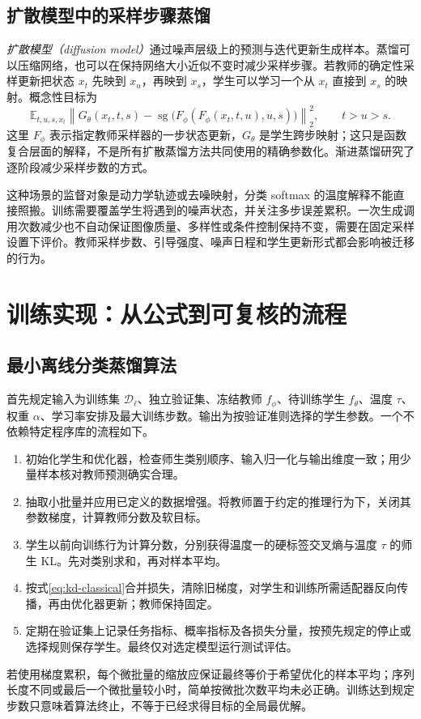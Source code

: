 \documentclass[UTF8,12pt,a4paper,fontset=fandol]{ctexart}
\begin{document}
\subsection{扩散模型中的采样步骤蒸馏}
\emph{扩散模型（diffusion model）}通过噪声层级上的预测与迭代更新生成样本。蒸馏可以压缩网络，也可以在保持网络大小近似不变时减少采样步骤。若教师的确定性采样更新把状态 $x_t$ 先映到 $x_u$，再映到 $x_s$，学生可以学习一个从 $x_t$ 直接到 $x_s$ 的映射。概念性目标为
\[
 \mathbb E_{t,u,s,x_t}\left\|
 G_\theta(x_t,t,s)-\operatorname{sg}
 \bigl(F_\phi(F_\phi(x_t,t,u),u,s)\bigr)\right\|_2^2,
 \qquad t>u>s.
\]
这里 $F_\phi$ 表示指定教师采样器的一步状态更新，$G_\theta$ 是学生跨步映射；这只是函数复合层面的解释，不是所有扩散蒸馏方法共同使用的精确参数化。渐进蒸馏研究了逐阶段减少采样步数的方式\cite{salimans2022}。

这种场景的监督对象是动力学轨迹或去噪映射，分类 softmax 的温度解释不能直接照搬。训练需要覆盖学生将遇到的噪声状态，并关注多步误差累积。一次生成调用次数减少也不自动保证图像质量、多样性或条件控制保持不变，需要在固定采样设置下评价。教师采样步数、引导强度、噪声日程和学生更新形式都会影响被迁移的行为。

\section{训练实现：从公式到可复核的流程}
\label{sec:kd-implementation}

\subsection{最小离线分类蒸馏算法}
首先规定输入为训练集 $\mathcal D_\ell$、独立验证集、冻结教师 $f_\phi$、待训练学生 $f_\theta$、温度 $\tau$、权重 $\alpha$、学习率安排及最大训练步数。输出为按验证准则选择的学生参数。一个不依赖特定程序库的流程如下。
\begin{enumerate}
 \item 初始化学生和优化器，检查师生类别顺序、输入归一化与输出维度一致；用少量样本核对教师预测确实合理。
 \item 抽取小批量并应用已定义的数据增强。将教师置于约定的推理行为下，关闭其参数梯度，计算教师分数及软目标。
 \item 学生以前向训练行为计算分数，分别获得温度一的硬标签交叉熵与温度 $\tau$ 的师生 KL。先对类别求和，再对样本平均。
 \item 按式\eqref{eq:kd-classical}合并损失，清除旧梯度，对学生和训练所需适配器反向传播，再由优化器更新；教师保持固定。
 \item 定期在验证集上记录任务指标、概率指标及各损失分量，按预先规定的停止或选择规则保存学生。最终仅对选定模型运行测试评估。
\end{enumerate}
若使用梯度累积，每个微批量的缩放应保证最终等价于希望优化的样本平均；序列长度不同或最后一个微批量较小时，简单按微批次数平均未必正确。训练达到规定步数只意味着算法终止，不等于已经求得目标的全局最优解。
\end{document}
